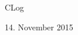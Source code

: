 \documentclass[oneside,12pt]{scrartcl}
\begin{document}
\setlength{\parindent}{0pt} %
\cofoot{}
\rofoot{\pagemark}

\begin{center}
\Huge{CLog} \par
\Large{14. November 2015}
\end{center}

\tableofcontents
\end{document}
